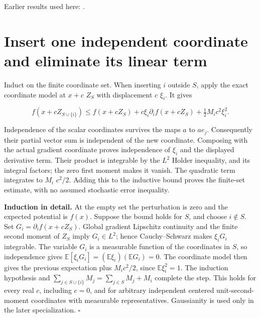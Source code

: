 \documentclass[11pt,a4paper]{article}
\begin{document}
Earlier results used here: \cite[Section~3.13.4]{LangevinLean2026ULASC}.

\section{\texorpdfstring{Insert one independent coordinate and eliminate its linear term}{Insert one independent coordinate and eliminate its linear term}}


Induct on the finite coordinate set. When inserting \(i\) outside \(S\), apply the exact coordinate model at \(x+c\) \(Z_S\) with displacement \(c\) \(\xi_i\). It gives

\[f(x+cZ_{S\cup\{i\}})\le f(x+cZ_S)+c\xi_i\partial_i f(x+cZ_S)+\tfrac12 M_i c^2\xi_i^2.\]

Independence of the scalar coordinates survives the maps \(a\) to \(ae_j\). Consequently their partial vector sum is independent of the new coordinate. Composing with the actual gradient coordinate proves independence of \(\xi_i\) and the displayed derivative term. Their product is integrable by the \(L^{2}\) Holder inequality, and its integral factors; the zero first moment makes it vanish. The quadratic term integrates to \(M_i\) \(c^2/2\). Adding this to the inductive bound proves the finite-set estimate, with no assumed stochastic error inequality.




\textbf{Induction in detail.} At the empty set the perturbation is zero and the expected potential is \(f(x)\). Suppose the bound holds for \(S\), and choose \(i\notin S\). Set \(G_i=\partial_i f(x+cZ_S)\). Global gradient Lipschitz continuity and the finite second moment of \(Z_S\) imply \(G_i\in L^2\); hence Cauchy–Schwarz makes \(\xi_iG_i\) integrable. The variable \(G_i\) is a measurable function of the coordinates in \(S\), so independence gives \(\mathbb E[\xi_iG_i]=(\mathbb E\xi_i)(\mathbb EG_i)=0\). The coordinate model then gives the previous expectation plus \(M_ic^2/2\), since \(\mathbb E\xi_i^2=1\). The induction hypothesis and \(\sum_{j\in S\cup\{i\}}M_j=\sum_{j\in S}M_j+M_i\) complete the step. This holds for every real \(c\), including \(c=0\), and for arbitrary independent centered unit-second-moment coordinates with measurable representatives. Gaussianity is used only in the later specialization. \(\square\)
\end{document}
